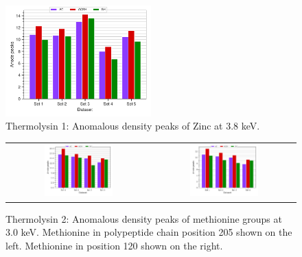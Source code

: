 \begin{figure}
    \centering
    \includegraphics[width = 0.5\textwidth]{plots/exp1/tlys_9_P6122/peaks/3p8_zinc.pdf}
    \caption{Thermolysin 1: Anomalous density peaks of Zinc at 3.8 \unit{keV}.}
    \label{fig:tlys9_zn_peaks_3p8}
\end{figure}



\begin{figure}
    \centering
    \begin{tabular}{cc}
        \includegraphics[width = 0.5\textwidth]{plots/exp1/tlys_2_P6122/peaks/3p0_met250.pdf} & \includegraphics[width = 0.5\textwidth]{plots/exp1/tlys_2_P6122/peaks/3p0_met120.pdf}
    \end{tabular}
    \caption{Thermolysin 2: Anomalous density peaks of methionine groups at 3.0 \unit{keV}. Methionine in polypeptide chain position 205 shown on the left. Methionine in position 120 shown on the right.}
    \label{fig:tlys2_met_peaks_3p0}
\end{figure}


